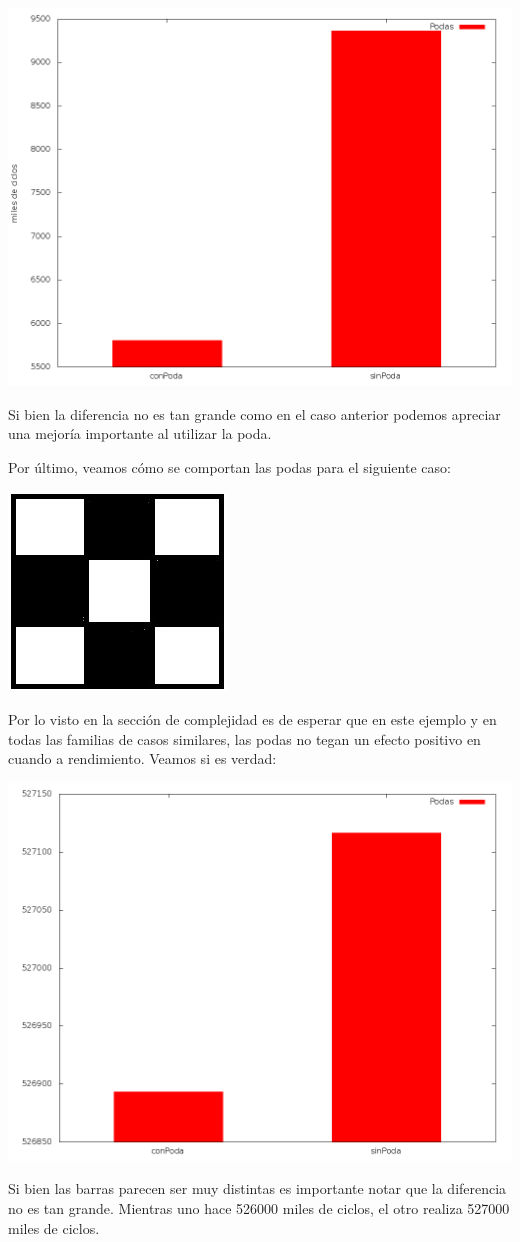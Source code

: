 \includegraphics[scale=0.2]{ej3/imgs/22casos.png}

Si bien la diferencia no es tan grande como en el caso anterior podemos apreciar una mejoría importante al utilizar la poda.

Por último, veamos cómo se comportan las podas para el siguiente caso:

\includegraphics[scale=0.5]{ej3/imgs/ajedrezDibujo.png}

Por lo visto en la sección de complejidad es de esperar que en este ejemplo y en todas las familias de casos similares, las podas no tegan un efecto positivo en cuando a rendimiento. Veamos si es verdad:

\includegraphics[scale=0.2]{ej3/imgs/ajedrez.png}

Si bien las barras parecen ser muy distintas es importante notar que la diferencia no es tan grande. Mientras uno hace 526000 miles de ciclos, el otro realiza 527000 miles de ciclos.

